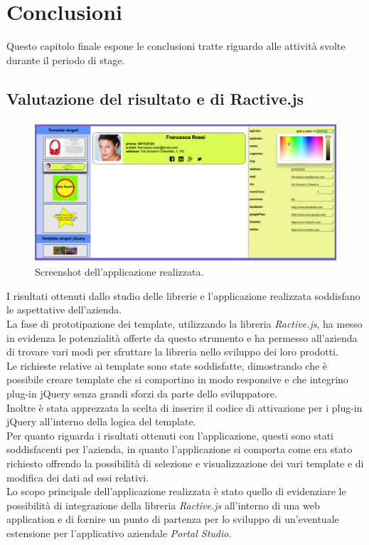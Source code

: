 
\chapter{Conclusioni}
\label{cap:conclusioni}

Questo capitolo finale espone le conclusioni tratte riguardo alle attività svolte durante il periodo di stage.

\section{Valutazione del risultato e di Ractive.js}
\begin{figure}[htp]
	\centering
	\includegraphics[scale=0.31]{../immagini/screenshot_app}
	\caption{Screenshot dell'applicazione realizzata.}
\end{figure}
I risultati ottenuti dallo studio delle librerie e l'applicazione realizzata soddisfano le aspettative dell'azienda.\\
La fase di prototipazione dei template, utilizzando la libreria \textit{Ractive.js}, ha messo in evidenza le potenzialità offerte da questo strumento e ha permesso all'azienda di trovare vari modi per sfruttare la libreria nello sviluppo dei loro prodotti.\\
Le richieste relative ai template sono state soddisfatte, dimostrando che è possibile creare template che si comportino in modo responsive e che integrino plug-in jQuery senza grandi sforzi da parte dello sviluppatore.\\
Inoltre è stata apprezzata la scelta di inserire il codice di attivazione per i plug-in jQuery all'interno della logica del template.\\
Per quanto riguarda i risultati ottenuti con l'applicazione, questi sono stati soddisfacenti per l'azienda, in quanto l'applicazione si comporta come era stato richiesto offrendo la possibilità di selezione e visualizzazione dei vari template e di modifica dei dati ad essi relativi.\\
Lo scopo principale dell'applicazione realizzata è stato quello di evidenziare le possibilità di integrazione della libreria \textit{Ractive.js} all'interno di una web application e di fornire un punto di partenza per lo sviluppo di un'eventuale estensione per l'applicativo aziendale \textit{Portal Studio}.
 

